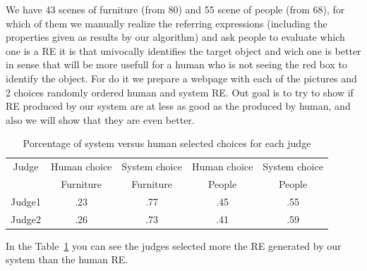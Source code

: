 We have 43 scenes of furniture (from 80) and 55 scene of people (from 68), for which of them we manually realize the referring expressions (including the properties given as results by our algorithm) and ask people to evaluate which one is a RE it is that univocally identifies the target object and wich one is better in sense that will be more usefull for a human who is not seeing the red box to identify the object. For do it we prepare a webpage with each of the pictures and 2 choices randomly ordered human and system RE. Out goal is to try to show if RE produced by our system are at less as good as the produced by human, and also we will show that they are even better.



\begin{table}[h!]
\begin{center}
\begin{tabular}{|c|c|c|c|c|}
\hline
Judge    & Human choice & System choice  & Human choice & System choice \\
	 &    Furniture &    Furniture   &    People    &    People \\
\hline 
Judge1   & .23       & .77      & .45  & .55  \\
Judge2   & .26       & .73      & .41  & .59  \\
\hline
\end{tabular}
\vspace*{.1cm}
\caption{Porcentage of system versus human selected choices for each judge} 
\label{system-versus-human}
\end{center}
\end{table}
\vspace*{-.9cm}
In the Table~\ref{system-versus-human} you can see the judges selected more the RE generated by our system than the human RE.

